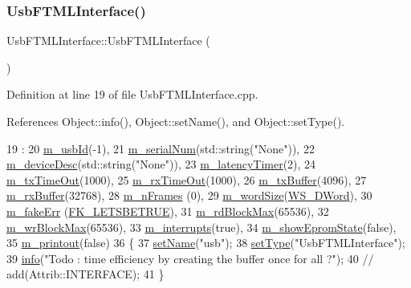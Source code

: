 \subsubsection{\texorpdfstring{Usb\+F\+T\+M\+L\+Interface()}{UsbFTMLInterface()}}
{\footnotesize\ttfamily Usb\+F\+T\+M\+L\+Interface\+::\+Usb\+F\+T\+M\+L\+Interface (\begin{DoxyParamCaption}{ }\end{DoxyParamCaption})}



Definition at line 19 of file Usb\+F\+T\+M\+L\+Interface.\+cpp.



References Object\+::info(), Object\+::set\+Name(), and Object\+::set\+Type().


\begin{DoxyCode}
19                                      : 
20   \hyperlink{classUsbFTMLInterface_aab6754587c303660d5c498ce34a2b4c8}{m\_usbId}(-1),
21   \hyperlink{classUsbFTMLInterface_a389d847226de3203f7331ab8509c442c}{m\_serialNum}(std::string(\textcolor{stringliteral}{"None"})),
22   \hyperlink{classUsbFTMLInterface_a15063a6d03335ec8988e41eb61a1ab9f}{m\_deviceDesc}(std::string(\textcolor{stringliteral}{"None"})),
23   \hyperlink{classUsbFTMLInterface_a28342ea2c00af670f1376aaa36ad0236}{m\_latencyTimer}(2),
24   \hyperlink{classUsbFTMLInterface_a48cd0df4e1d8fd53d96b208b5b9c7061}{m\_txTimeOut}(1000),
25   \hyperlink{classUsbFTMLInterface_a4e3a413912cb5f61b5885c0d22e6c179}{m\_rxTimeOut}(1000),
26   \hyperlink{classUsbFTMLInterface_a4057fb62dc732ffe98df5c46231d7a23}{m\_txBuffer}(4096),
27   \hyperlink{classUsbFTMLInterface_a8f0f8bb2a4fe14ca4890695f41fbcbf8}{m\_rxBuffer}(32768),
28   \hyperlink{classUsbFTMLInterface_ac7b9fb80fb8653a366c53ce3567cb823}{m\_nFrames} (0),
29   \hyperlink{classUsbFTMLInterface_a39a8dfbe54cc29e033fa2a4d5fbbc982}{m\_wordSize}(\hyperlink{classUsbFTMLInterface_ae0f25daa336091a5acd548aef3e9b4b4abff203c40a75d695acbf9190ae2dbe69}{WS\_DWord}),
30   \hyperlink{classUsbFTMLInterface_a35c84586c9aae7555b56481d636338e8}{m\_fakeErr} (\hyperlink{LALUsbML_8h_a9dc924c9c4161118ac45416ade6f1c40a6356e390467faee4dfb43daa2c445323}{FK\_LETSBETRUE}),
31   \hyperlink{classUsbFTMLInterface_af950506bbfb1e198af7ea2141058d018}{m\_rdBlockMax}(65536),
32   \hyperlink{classUsbFTMLInterface_adb3d6b099e8283d80360f78fab064285}{m\_wrBlockMax}(65536),
33   \hyperlink{classUsbFTMLInterface_adb6a6a61e78d9b489e6ecefd5752d5ad}{m\_interrupts}(\textcolor{keyword}{true}),
34   \hyperlink{classUsbFTMLInterface_ac9505aba2e8a9fd9de9aed880a56a650}{m\_showEpromState}(\textcolor{keyword}{false}),
35   \hyperlink{classUsbFTMLInterface_a57b909e50c9eba8ffbcb66e0d9649632}{m\_printout}(\textcolor{keyword}{false})
36 \{ 
37   \hyperlink{classObject_ae30fea75683c2d149b6b6d17c09ecd0c}{setName}(\textcolor{stringliteral}{"usb"});
38   \hyperlink{classObject_aae534cc9d982bcb9b99fd505f2e103a5}{setType}(\textcolor{stringliteral}{"UsbFTMLInterface"});
39   \hyperlink{classObject_a644fd329ea4cb85f54fa6846484b84a8}{info}(\textcolor{stringliteral}{"Todo : time efficiency by creating the buffer once for all ?"});
40   \textcolor{comment}{//  add(Attrib::INTERFACE);}
41 \}
\end{DoxyCode}
